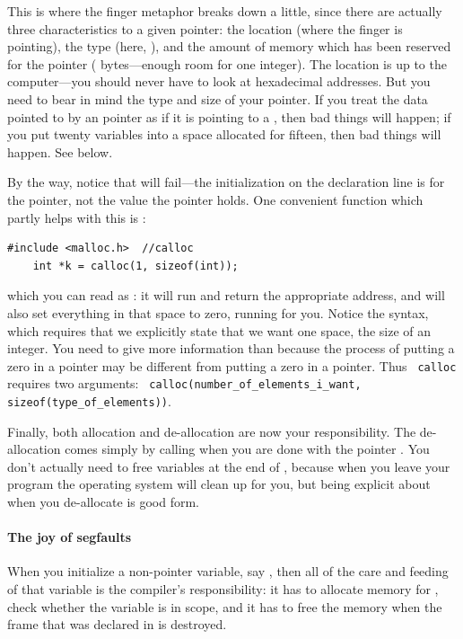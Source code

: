 \documentclass[12pt]{article}
\makeatletter
\def\cind#1{\index{#1@\ci{#1}}\ci{#1}}
\def\cindex#1{\index{#1@\ci{#1}}}
\makeatother
\begin{document}
This is where the finger metaphor breaks down a little, since there are actually three characteristics
to a given pointer: the location (where the finger is pointing), the type (here, ), and the
amount of memory which has been reserved for the pointer ( bytes---enough room for one
integer). The location is up to the computer---you should never have
to look at hexadecimal addresses. But you need to bear in mind the type
and size of your pointer. If you treat the data pointed to by an  pointer as if it is pointing to a , then bad things will
happen; if you put twenty variables into a space allocated for fifteen,
then bad things will happen. See below.

By the way, notice that  will fail---the initialization on the declaration line is for
the pointer, not the value the pointer holds. One convenient function which partly helps with this is
\cind{calloc}:
\begin{lstlisting}
#include <malloc.h>  //calloc
    int *k = calloc(1, sizeof(int));
\end{lstlisting}
which you can read as : it will run 
and return the appropriate address, and will also set everything in
that space to zero, running  for you. Notice the syntax,
which requires that we explicitly state that we want one space, the
size of an integer. You need to give more information than 
because the process of putting a zero in a  pointer may be
different from putting a zero in a  pointer. Thus {\tt
calloc} requires two arguments: {\tt
calloc(number\_of\_elements\_i\_want, sizeof(type\_of\_elements))}.

Finally, both allocation and de-allocation are now your
responsibility. The de-allocation comes simply by calling
 \cindex{free} when you are done with the pointer
. You don't actually need to free variables at the end of
, because when you leave your program the operating system
will clean up for you, but being explicit about when you de-allocate is
good form.

\paragraph{The joy of segfaults}  
When you initialize a non-pointer variable, say , then all of
the care and feeding of that variable is the compiler's responsibility:
it has to allocate memory for , check whether the variable is
in scope, and it has to free the memory when the frame that 
was declared in is destroyed.
\end{document}
